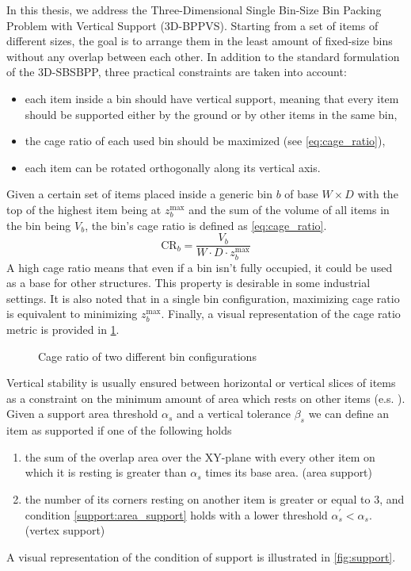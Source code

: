 In this thesis, we address the Three-Dimensional Single Bin-Size Bin Packing Problem with Vertical Support (3D-BPPVS).
Starting from a set of items of different sizes, the goal is to arrange them in the least amount of fixed-size bins without any overlap between each other.
In addition to the standard formulation of the 3D-SBSBPP, three practical constraints are taken into account:
\begin{itemize}
    \item each item inside a bin should have vertical support, meaning that every item should be supported either by the ground or by other items in the same bin,
    \item the cage ratio of each used bin should be maximized (see \cref{eq:cage_ratio}),
    \item each item can be rotated orthogonally along its vertical axis.
\end{itemize}

Given a certain set of items placed inside a generic bin $b$ of base $W \times D$ with the top of the highest item being at $z_b^\text{max}$ and the sum of the volume of all items in the bin being $V_b$, the bin's cage ratio is defined as \cref{eq:cage_ratio}.
\begin{equation}
    \label{eq:cage_ratio}
    \text{CR}_b = \frac{V_b}{W \cdot D \cdot z_b^\text{max}}
\end{equation}
A high cage ratio means that even if a bin isn't fully occupied, it could be used as a base for other structures. This property is desirable in some industrial settings.
It is also noted that in a single bin configuration, maximizing cage ratio is equivalent to minimizing $z_b^\text{max}$. Finally, a visual representation of the cage ratio metric is provided in \cref{fig:cage_ratio}.

\begin{figure}[H]
    \scalebox{0.60}{%
    
    }
    \caption{Cage ratio of two different bin configurations}
    \label{fig:cage_ratio}
\end{figure}

Vertical stability is usually ensured between horizontal or vertical slices of items as a constraint on the minimum amount of area which rests on other items (e.s. \cite{GZARA20201062,kurpel2020exact,paquay2016mixed}).
Given a support area threshold $\alpha_s$ and a vertical tolerance $\beta_s$ we can define an item as supported if one of the following holds
\begin{enumerate}
    \item the sum of the overlap area over the XY-plane with every other item on which it is resting is greater than $\alpha_s$ times its base area. (area support) \label{support:area_support}
    \item the number of its corners resting on another item is greater or equal to 3, and condition \ref{support:area_support} holds with a lower threshold $\alpha^\prime_s < \alpha_s$. (vertex support) \label{support:vertex_support}
\end{enumerate}
A visual representation of the condition of support is illustrated in \cref{fig:support}.

